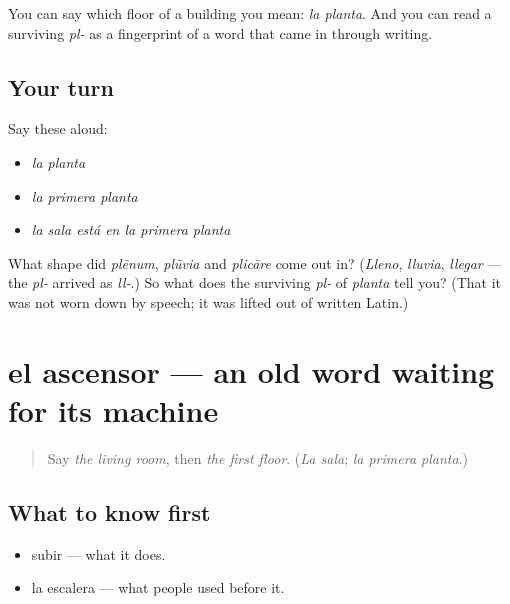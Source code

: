 \begin{grammarlens}[title={What you've built}]
You can say which floor of a building you mean: \emph{la planta}. And you can read a surviving \emph{pl-} as a fingerprint of a word that came in through writing.
\end{grammarlens}

\subsection*{Your turn}
Say these aloud:

\begin{itemize}
\raggedright
  \item \emph{la planta}
  \item \emph{la primera planta}
  \item \emph{la sala está en la primera planta}
\end{itemize}

\begin{tcolorbox}[breakable,colback=teal!4,colframe=teal!35!black,title={Before you move on}]
What shape did \emph{plēnum}, \emph{plūvia} and \emph{plicāre} come out in? (\emph{Lleno}, \emph{lluvia}, \emph{llegar} — the \emph{pl-} arrived as \emph{ll-}.) So what does the surviving \emph{pl-} of \emph{planta} tell you? (That it was not worn down by speech; it was lifted out of written Latin.)
\end{tcolorbox}
\section[el ascensor]{el ascensor — an old word waiting for its machine}

\label{lesson:ES-C390-ascensor}



\begin{quote}
Say \emph{the living room}, then \emph{the first floor}. (\emph{La sala}; \emph{la primera planta}.)
\end{quote}

\subsection*{What to know first}
\begin{itemize}
\raggedright
  \item subir — what it does.
  \item la escalera — what people used before it.
\end{itemize}

